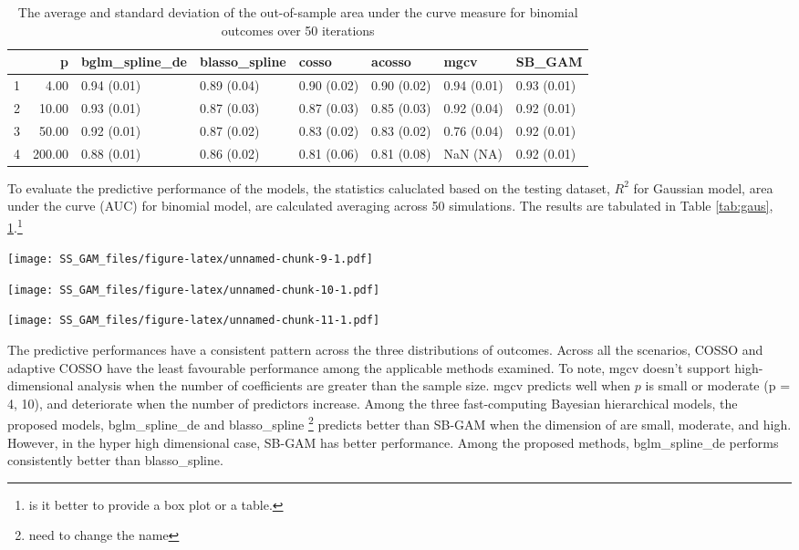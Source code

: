 \documentclass[AMA,STIX1COL,]{WileyNJD-v2}
\begin{document}
\begin{table}[ht]
\centering
\begin{tabular}{rrllllll}
  \hline
 & p & bglm\_spline\_de & blasso\_spline & cosso & acosso & mgcv & SB\_GAM \\ 
  \hline
1 & 4.00 & 0.94 (0.01) & 0.89 (0.04) & 0.90 (0.02) & 0.90 (0.02) & 0.94 (0.01) & 0.93 (0.01) \\ 
  2 & 10.00 & 0.93 (0.01) & 0.87 (0.03) & 0.87 (0.03) & 0.85 (0.03) & 0.92 (0.04) & 0.92 (0.01) \\ 
  3 & 50.00 & 0.92 (0.01) & 0.87 (0.02) & 0.83 (0.02) & 0.83 (0.02) & 0.76 (0.04) & 0.92 (0.01) \\ 
  4 & 200.00 & 0.88 (0.01) & 0.86 (0.02) & 0.81 (0.06) & 0.81 (0.08) & NaN (NA) & 0.92 (0.01) \\ 
   \hline
\end{tabular}
\caption{The average and standard deviation of the out-of-sample area under the curve measure for binomial outcomes over 50 iterations} 
\label{tab:bin_auc}
\end{table}

To evaluate the predictive performance of the models, the statistics
caluclated based on the testing dataset, \(R^2\) for Gaussian model,
area under the curve (AUC) for binomial model, are calculated averaging
across 50 simulations. The results are tabulated in Table
\ref{tab:gaus}, \ref{tab:bin_auc}.\footnote{is it better to provide a
  box plot or a table.}

\texttt{[image: SS\_GAM\_files/figure-latex/unnamed-chunk-9-1.pdf]}

\texttt{[image: SS\_GAM\_files/figure-latex/unnamed-chunk-10-1.pdf]}

\texttt{[image: SS\_GAM\_files/figure-latex/unnamed-chunk-11-1.pdf]}

The predictive performances have a consistent pattern across the three
distributions of outcomes. Across all the scenarios, COSSO and adaptive
COSSO have the least favourable performance among the applicable methods
examined. To note, mgcv doesn't support high-dimensional analysis when
the number of coefficients are greater than the sample size. mgcv
predicts well when \(p\) is small or moderate (p = 4, 10), and
deteriorate when the number of predictors increase. Among the three
fast-computing Bayesian hierarchical models, the proposed models,
bglm\_spline\_de and blasso\_spline \footnote{need to change the name}
predicts better than SB-GAM when the dimension of are small, moderate,
and high. However, in the hyper high dimensional case, SB-GAM has better
performance. Among the proposed methods, bglm\_spline\_de performs
consistently better than blasso\_spline.
\end{document}
